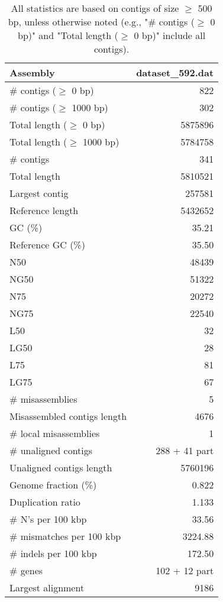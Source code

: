 \documentclass[12pt,a4paper]{article}
\begin{document}
\begin{table}[ht]
\begin{center}
\caption{All statistics are based on contigs of size $\geq$ 500 bp, unless otherwise noted (e.g., "\# contigs ($\geq$ 0 bp)" and "Total length ($\geq$ 0 bp)" include all contigs).}
\begin{tabular}{|l*{1}{|r}|}
\hline
Assembly & dataset\_592.dat \\ \hline
\# contigs ($\geq$ 0 bp) & 822 \\ \hline
\# contigs ($\geq$ 1000 bp) & 302 \\ \hline
Total length ($\geq$ 0 bp) & 5875896 \\ \hline
Total length ($\geq$ 1000 bp) & 5784758 \\ \hline
\# contigs & 341 \\ \hline
Total length & 5810521 \\ \hline
Largest contig & 257581 \\ \hline
Reference length & 5432652 \\ \hline
GC (\%) & 35.21 \\ \hline
Reference GC (\%) & 35.50 \\ \hline
N50 & 48439 \\ \hline
NG50 & 51322 \\ \hline
N75 & 20272 \\ \hline
NG75 & 22540 \\ \hline
L50 & 32 \\ \hline
LG50 & 28 \\ \hline
L75 & 81 \\ \hline
LG75 & 67 \\ \hline
\# misassemblies & 5 \\ \hline
Misassembled contigs length & 4676 \\ \hline
\# local misassemblies & 1 \\ \hline
\# unaligned contigs & 288 + 41 part \\ \hline
Unaligned contigs length & 5760196 \\ \hline
Genome fraction (\%) & 0.822 \\ \hline
Duplication ratio & 1.133 \\ \hline
\# N's per 100 kbp & 33.56 \\ \hline
\# mismatches per 100 kbp & 3224.88 \\ \hline
\# indels per 100 kbp & 172.50 \\ \hline
\# genes & 102 + 12 part \\ \hline
Largest alignment & 9186 \\ \hline
\end{tabular}
\end{center}
\end{table}
\end{document}
